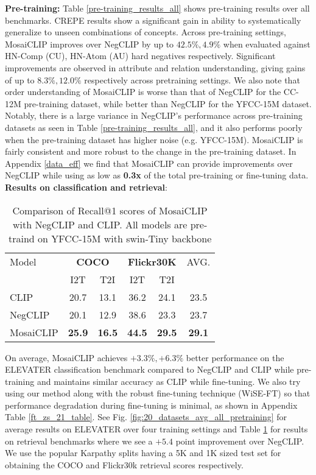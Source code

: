 \documentclass[11pt]{article}
\newcommand{\methodcomp}{MosaiCLIP}
\newcommand{\clip}{CLIP}
\newcommand{\negclip}{NegCLIP}
\begin{document}
\noindent \textbf{Pre-training:} Table \ref{pre-training_results_all} shows pre-training results over all benchmarks. CREPE results show a significant gain in ability to systematically generalize to unseen combinations of concepts. Across pre-training settings, \methodcomp{} improves over \negclip{} by up to {$42.5\%, 4.9\%$} when evaluated against HN-Comp (CU), HN-Atom (AU) hard negatives respectively. Significant improvements are observed in attribute and relation understanding, giving gains of up to {$8.3\%, 12.0\%$} respectively across pretraining settings. We also note that order understanding of \methodcomp{} is worse than that of \negclip{} for the CC-12M pre-training dataset, while better than \negclip{} for the YFCC-15M dataset. Notably, there is a large variance in \negclip{}'s performance across pre-training datasets as seen in Table \ref{pre-training_results_all}, and it also performs poorly when the pre-training dataset has higher noise (e.g. YFCC-15M). \methodcomp{} is fairly consistent and more robust to the change in the pre-training dataset. In Appendix \ref{data_eff} we find that \methodcomp{} can provide improvements over \negclip{} while using as low as \textbf{0.3x} of the total pre-training or fine-tuning data.\\
\newline
\noindent \textbf{Results on classification and retrieval}:
\begin{table}[h]
\fontsize{10.5}{13pt}\selectfont
    \centering
    \begin{tabular}{lcccc|c}
    \toprule
    {Model} & \multicolumn{2}{c}{\textbf{COCO}} &  \multicolumn{2}{c}{\textbf{Flickr30K}} & {AVG.}\\
    \cmidrule(lr){2-3} \cmidrule(lr){4-5}
    & {I2T} & {T2I} & {I2T} & {T2I} & \\
    \midrule
    CLIP & 20.7 & 13.1 & 36.2 & 24.1 & 23.5 \\
    NegCLIP & 20.1 & 12.9 & 38.6 & 23.3 & 23.7 \\
    \rowcolor{cyan!12}
    MosaiCLIP & \textbf{25.9} & \textbf{16.5} & \textbf{44.5} & \textbf{29.5} & \textbf{29.1} \\
    \bottomrule
    \end{tabular}
    \caption{Comparison of Recall@1 scores of \methodcomp{} with \negclip{} and \clip{}. All models are pre-traind on YFCC-15M with swin-Tiny backbone}
    \label{classification-results}
    \vspace{-1.5em}
\end{table}
On average, \methodcomp{} achieves $+3.3\%, +6.3\%$ better performance on the ELEVATER classification benchmark compared to \negclip{} and \clip{} while pre-training and maintains similar accuracy as \clip{} while fine-tuning. We also try using our method along with the robust fine-tuning technique (WiSE-FT) so that performance degradation during fine-tuning is minimal, as shown in Appendix Table \ref{ft_zs_21_table}. See Fig. \ref{fig:20_datasets_avg_all_pretraining} for average results on ELEVATER over four training settings and Table \ref{classification-results} for results on retrieval benchmarks where we see a $+5.4$ point improvement over \negclip{}. We use the popular Karpathy splits having a 5K and 1K sized test set for obtaining the COCO and Flickr30k retrieval scores respectively.
\end{document}

